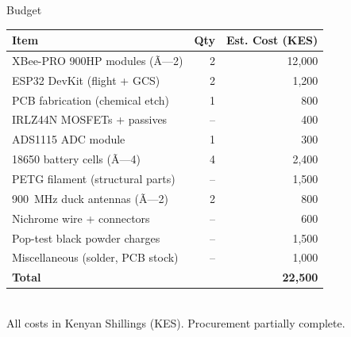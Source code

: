 \documentclass[aspectratio=169, 11pt]{beamer}
\begin{document}
\begin{frame}{Budget}
\centering
\small
\begin{tabular}{@{}p{5.0cm}rr@{}}
  \toprule
  \textbf{Item} & \textbf{Qty} & \textbf{Est. Cost (KES)}\\
  \midrule
  XBee-PRO 900HP modules (Ã—2)        & 2   & 12{,}000 \\
  ESP32 DevKit (flight + GCS)         & 2   & 1{,}200  \\
  PCB fabrication (chemical etch)     & 1   & 800      \\
  IRLZ44N MOSFETs + passives          & --  & 400      \\
  ADS1115 ADC module                  & 1   & 300      \\
  18650 battery cells (Ã—4)            & 4   & 2{,}400  \\
  PETG filament (structural parts)    & --  & 1{,}500  \\
  900~MHz duck antennas (Ã—2)          & 2   & 800      \\
  Nichrome wire + connectors          & --  & 600      \\
  Pop-test black powder charges       & --  & 1{,}500  \\
  Miscellaneous (solder, PCB stock)   & --  & 1{,}000  \\
  \midrule
  \textbf{Total}                      &     & \textbf{22{,}500} \\
  \bottomrule
\end{tabular}\\[6pt]
{\small All costs in Kenyan Shillings (KES). Procurement partially complete.}
\end{frame}
\end{document}
